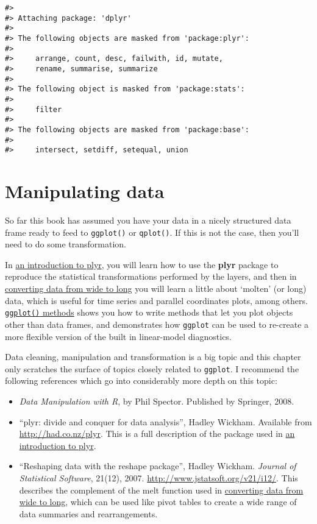 \begin{verbatim}
#> 
#> Attaching package: 'dplyr'
#> 
#> The following objects are masked from 'package:plyr':
#> 
#>     arrange, count, desc, failwith, id, mutate,
#>     rename, summarise, summarize
#> 
#> The following object is masked from 'package:stats':
#> 
#>     filter
#> 
#> The following objects are masked from 'package:base':
#> 
#>     intersect, setdiff, setequal, union
\end{verbatim}

\chapter{Manipulating data}\label{cha:data}

So far this book has assumed you have your data in a nicely structured
data frame ready to feed to \texttt{ggplot()} or \texttt{qplot()}. If
this is not the case, then you'll need to do some transformation.

In \hyperref[sec:plyr]{an introduction to plyr}, you will learn how to
use the \textbf{plyr} package to reproduce the statistical
transformations performed by the layers, and then in
\hyperref[sec:melting]{converting data from wide to long} you will learn
a little about `molten' (or long) data, which is useful for time series
and parallel coordinates plots, among others.
\hyperref[sec:methods]{\texttt{ggplot()} methods} shows you how to write
methods that let you plot objects other than data frames, and
demonstrates how \texttt{ggplot} can be used to re-create a more
flexible version of the built in linear-model diagnostics.

Data cleaning, manipulation and transformation is a big topic and this
chapter only scratches the surface of topics closely related to
\texttt{ggplot}. I recommend the following references which go into
considerably more depth on this topic:

\begin{itemize}
\itemsep1pt\parskip0pt
\item
  \emph{Data Manipulation with R}, by Phil Spector. Published by
  Springer, 2008.
\item
  ``plyr: divide and conquer for data analysis'', Hadley Wickham.
  Available from \url{http://had.co.nz/plyr}. This is a full description
  of the package used in \hyperref[sec:plyr]{an introduction to plyr}.
\item
  ``Reshaping data with the reshape package'', Hadley Wickham.
  \emph{Journal of Statistical Software}, 21(12), 2007.
  \url{http://www.jstatsoft.org/v21/i12/}. This describes the complement
  of the melt function used in \hyperref[sec:melting]{converting data
  from wide to long}, which can be used like pivot tables to create a
  wide range of data summaries and rearrangements.
\end{itemize}

